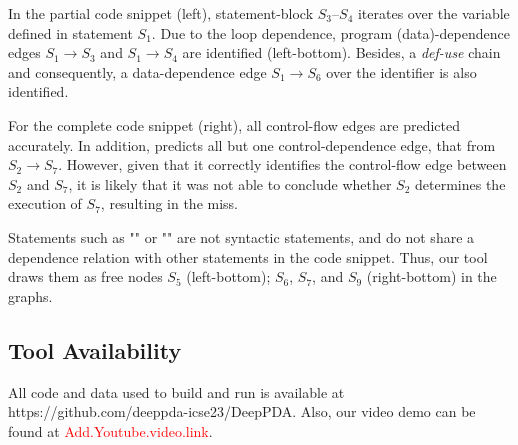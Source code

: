 In the partial code snippet (left), statement-block $S_3$--$S_4$ iterates over the variable  defined in statement $S_1$. Due to the loop dependence, program (data)-dependence edges $S_1{\rightarrow}S_3$ and $S_1{\rightarrow}S_4$ are identified (left-bottom). Besides, a \textit{def-use} chain and consequently, a data-dependence edge $S_1{\rightarrow}S_6$  over the identifier  is also identified.

For the complete code snippet (right), all control-flow edges are predicted accurately. In addition, \tool predicts all but one control-dependence edge, that from $S_2{\rightarrow}S_7$. However, given that it correctly identifies the control-flow edge between $S_2$ and $S_7$, it is likely that it was not able to conclude whether $S_2$ determines the execution of $S_7$, resulting in the miss.

Statements such as "\code{\{}" or "\code{\}}" are not syntactic statements, and do not share a dependence relation with other statements in the code snippet. Thus, our tool draws them as free nodes $S_5$ (left-bottom); $S_6$, $S_7$, and $S_9$ (right-bottom) in the graphs.

\subsection{Tool Availability}
All code and data used to build and run \tool is available at {https://github.com/deeppda-icse23/DeepPDA}. Also, our video demo can be found at \textcolor{red}{{Add.Youtube.video.link}}.